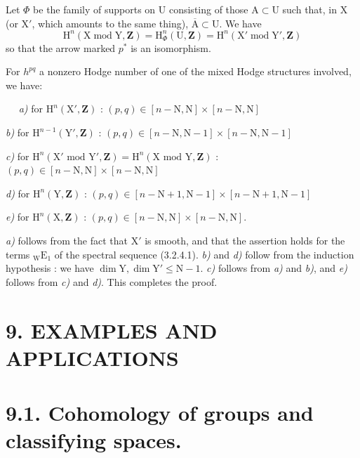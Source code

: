 \documentclass[11pt,leqno]{article}
\newcommand{\Page}[1]{\ifvmode\noindent\else\unskip\ \fi{\footnotesize\textcolor{gray}{[p.\,#1]}}\ \ignorespaces}
\begin{document}
Let \(\Phi\) be the family of supports on \(\mathrm{U}\) consisting of those \(\mathrm{A}\subset\mathrm{U}\) such that, in \(\mathrm{X}\) (or \(\mathrm{X}'\), which amounts to the same thing), \(\overline{\mathrm{A}}\subset\mathrm{U}\). We have
\[
\mathrm{H}^n(\mathrm{X}\operatorname{mod}\mathrm{Y},\mathbf{Z})
=\mathrm{H}^n_\Phi(\mathrm{U},\mathbf{Z})
=\mathrm{H}^n(\mathrm{X}'\operatorname{mod}\mathrm{Y}',\mathbf{Z})
\]
so that the arrow marked \(p^*\) is an isomorphism.

For \(h^{pq}\) a nonzero Hodge number of one of the mixed Hodge structures involved, we have:

\Page{45}
\noindent\textit{a)} for \(\mathrm{H}^{n}(\mathrm{X}',\mathbf{Z})\) : \((p,q)\in[n-\mathrm{N},\mathrm{N}]\times[n-\mathrm{N},\mathrm{N}]\)

\noindent\textit{b)} for \(\mathrm{H}^{n-1}(\mathrm{Y}',\mathbf{Z})\) : \((p,q)\in[n-\mathrm{N},\mathrm{N}-1]\times[n-\mathrm{N},\mathrm{N}-1]\)

\noindent\textit{c)} for \(\mathrm{H}^{n}(\mathrm{X}'\text{ mod }\mathrm{Y}',\mathbf{Z})=\mathrm{H}^{n}(\mathrm{X}\text{ mod }\mathrm{Y},\mathbf{Z})\) : \((p,q)\in[n-\mathrm{N},\mathrm{N}]\times[n-\mathrm{N},\mathrm{N}]\)

\noindent\textit{d)} for \(\mathrm{H}^{n}(\mathrm{Y},\mathbf{Z})\) : \((p,q)\in[n-\mathrm{N}+1,\mathrm{N}-1]\times[n-\mathrm{N}+1,\mathrm{N}-1]\)

\noindent\textit{e)} for \(\mathrm{H}^{n}(\mathrm{X},\mathbf{Z})\) : \((p,q)\in[n-\mathrm{N},\mathrm{N}]\times[n-\mathrm{N},\mathrm{N}]\).

\textit{a)} follows from the fact that \(\mathrm{X}'\) is smooth, and that the assertion holds for the terms \({}_{\mathrm{W}}\mathrm{E}_{1}\) of the spectral sequence (3.2.4.1). \textit{b)} and \textit{d)} follow from the induction hypothesis : we have \(\dim\mathrm{Y},\dim\mathrm{Y}'\leq\mathrm{N}-1\). \textit{c)} follows from \textit{a)} and \textit{b)}, and \textit{e)} follows from \textit{c)} and \textit{d)}. This completes the proof.

\section*{9. EXAMPLES AND APPLICATIONS}

\section*{9.1. Cohomology of groups and classifying spaces.}
\end{document}
